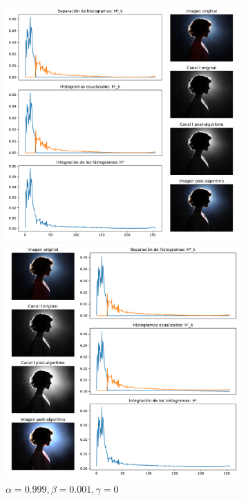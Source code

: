 \begin{figure}[H]
\begin{minipage}[c]{0.48\linewidth}
  \includegraphics[height=9cm]{imgs/wom-1-0-0.pdf}
  \caption{$\alpha = 1, \beta = 0, \gamma = 0$}
\end{minipage}
\hfill
\begin{minipage}[c]{0.48\linewidth}
  \includegraphics[height=9cm]{imgs/wom-999-001-0.pdf}
  \caption{$\alpha = 0.999, \beta = 0.001, \gamma = 0$}
\end{minipage}%
\end{figure}

